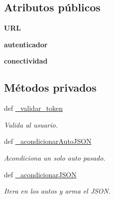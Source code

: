 \subsection*{Atributos públicos}
\begin{DoxyCompactItemize}
\item 
\hypertarget{classsrc_1_1resources_1_1autos_por_usuario_1_1_autos_por_usuario_ab807466a9663543fac59732a8158be95}{{\bfseries U\-R\-L}}\label{classsrc_1_1resources_1_1autos_por_usuario_1_1_autos_por_usuario_ab807466a9663543fac59732a8158be95}

\item 
\hypertarget{classsrc_1_1resources_1_1autos_por_usuario_1_1_autos_por_usuario_aeec994ebf06f73c686dd5560da3add73}{{\bfseries autenticador}}\label{classsrc_1_1resources_1_1autos_por_usuario_1_1_autos_por_usuario_aeec994ebf06f73c686dd5560da3add73}

\item 
\hypertarget{classsrc_1_1resources_1_1autos_por_usuario_1_1_autos_por_usuario_a6051075279fa029ec201c816a791094f}{{\bfseries conectividad}}\label{classsrc_1_1resources_1_1autos_por_usuario_1_1_autos_por_usuario_a6051075279fa029ec201c816a791094f}

\end{DoxyCompactItemize}
\subsection*{Métodos privados}
\begin{DoxyCompactItemize}
\item 
def \hyperlink{classsrc_1_1resources_1_1autos_por_usuario_1_1_autos_por_usuario_adec61b4d99af1d8a37538e36572a047f}{\-\_\-validar\-\_\-token}
\begin{DoxyCompactList}\small\item\em Valida al usuario. \end{DoxyCompactList}\item 
def \hyperlink{classsrc_1_1resources_1_1autos_por_usuario_1_1_autos_por_usuario_ab536a2b91c380db5d95b8f88857fa4f4}{\-\_\-acondicionar\-Auto\-J\-S\-O\-N}
\begin{DoxyCompactList}\small\item\em Acondiciona un solo auto pasado. \end{DoxyCompactList}\item 
def \hyperlink{classsrc_1_1resources_1_1autos_por_usuario_1_1_autos_por_usuario_a31c3ea98b38c88058e0036d95d06bd8c}{\-\_\-acondicionar\-J\-S\-O\-N}
\begin{DoxyCompactList}\small\item\em Itera en los autos y arma el J\-S\-O\-N. \end{DoxyCompactList}\end{DoxyCompactItemize}


